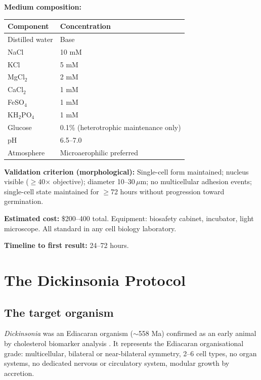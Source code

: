 \documentclass[12pt, a4paper]{article}
\theoremstyle{definition}
\theoremstyle{remark}
\begin{document}
\textbf{Medium composition:}
\begin{center}
\begin{tabular}{ll}
\toprule
\textbf{Component} & \textbf{Concentration} \\
\midrule
Distilled water & Base \\
NaCl & 10 mM \\
KCl & 5 mM \\
MgCl$_2$ & 2 mM \\
CaCl$_2$ & 1 mM \\
FeSO$_4$ & 1 mM \\
KH$_2$PO$_4$ & 1 mM \\
Glucose & 0.1\% (heterotrophic maintenance only) \\
pH & 6.5--7.0 \\
Atmosphere & Microaerophilic preferred \\
\bottomrule
\end{tabular}
\end{center}

\textbf{Validation criterion (morphological):}
Single-cell form maintained; nucleus visible
($\geq$40$\times$ objective); diameter 10--30\,$\mu$m;
no multicellular adhesion events; single-cell state
maintained for $\geq$72 hours without progression toward
germination.

\textbf{Estimated cost:} \$200--400 total.
Equipment: biosafety cabinet, incubator, light microscope.
All standard in any cell biology laboratory.

\textbf{Timeline to first result:} 24--72 hours.

\section{The Dickinsonia Protocol}

\subsection{The target organism}

\textit{Dickinsonia} was an Ediacaran organism ($\sim$558 Ma)
confirmed as an early animal by cholesterol biomarker
analysis \cite{bobrovskiy2018}. It represents the Ediacaran
organisational grade: multicellular, bilateral or
near-bilateral symmetry, 2--6 cell types, no organ systems,
no dedicated nervous or circulatory system, modular growth
by accretion.
\end{document}

